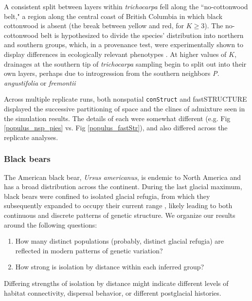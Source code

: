\documentclass[12pt]{article}
\newcommand{\tri}{\textit{trichocarpa}}
\begin{document}
A consistent split between layers within \tri{} fell along the ``no-cottonwood belt," 
a region along the central coast of British Columbia in which black
cottonwood is absent (the break between yellow and red, for $K \geq 3$). 
The no-cottonwood belt is hypothesized to divide the species' distribution
into northern and southern groups, which, in a provenance test, 
were experimentally shown to display differences in ecologically relevant phenotypes 
\citep[e.g., pathogen resistance,][]{xie2009,xie2012}.  
At higher values of $K$, drainages at the southern tip of \tri{} sampling 
begin to split out into their own layers,
perhaps due to introgression from the southern neighbors
\textit{P. angustifolia} or \textit{fremontii} \citep{Zhou2012,geraldes_etal_2014}


Across multiple replicate runs, 
both nonspatial \texttt{conStruct} and fastSTRUCTURE displayed 
the successive partitioning of space and the clines of admixture seen in the simulation results.
The details of each were somewhat different 
(e.g. Fig \ref{populus_nsp_pies} vs. Fig \ref{populus_fastStr}), 
and also differed across the replicate analyses.



\subsubsection*{Black bears}

The American black bear, \textit{Ursus americanus}, is endemic to North America
and has a broad distribution across the continent.
During the last glacial maximum, 
black bears were confined to isolated glacial refugia, 
from which they subsequently expanded to occupy their current range
\citep{WoodingWard1997,Byun1997,Stone2000,Puckett2015},
likely leading to both continuous and discrete patterns of genetic structure.
We organize our results around the following questions:
\begin{enumerate}
    \item How many distinct populations (probably, distinct glacial refugia)
        are reflected in modern patterns of genetic variation?
    \item How strong is isolation by distance within each inferred group?
\end{enumerate}
Differing strengths of isolation by distance might indicate 
different levels of habitat connectivity,
dispersal behavior,
or different postglacial histories.
\end{document}
